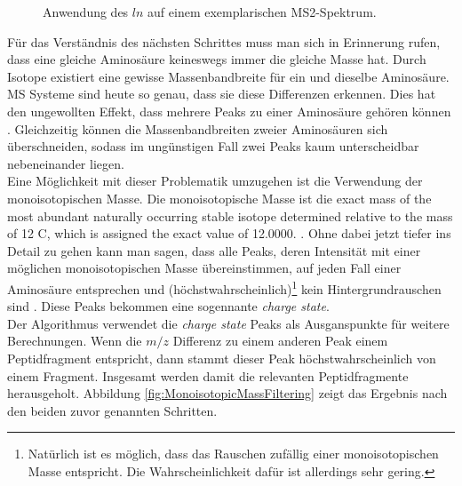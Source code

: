 \documentclass[a4paper, 12pt]{article}
\newcommand{\gerquot}[1]{\glqq#1\grqq}
\newcommand{\tikzScale}{1.0}
\newcommand{\massCharge}{$ m/z $ }
\begin{document}
\begin{figure}[H]
\begin{minipage}[t]{.45\linewidth}
      \end{minipage}
      \caption{Anwendung des $ ln $ auf einem exemplarischen MS2-Spektrum.}
\end{figure}

Für das Verständnis des nächsten Schrittes muss man sich in Erinnerung rufen, dass eine gleiche Aminosäure keineswegs immer die gleiche Masse hat. Durch Isotope existiert eine gewisse \gerquot{Massenbandbreite} für ein und dieselbe Aminosäure. MS Systeme sind heute so genau, dass sie diese Differenzen erkennen. Dies hat den ungewollten Effekt, dass mehrere Peaks zu einer Aminosäure gehören können \cite{IsotopicDistributionMS}. Gleichzeitig können die \gerquot{Massenbandbreiten} zweier Aminosäuren sich überschneiden, sodass im ungünstigen Fall zwei Peaks kaum unterscheidbar nebeneinander liegen.\\

Eine Möglichkeit mit dieser Problematik umzugehen ist die Verwendung der monoisotopischen Masse. Die monoisotopische Masse ist die \gerquot{[...] exact mass of the most abundant naturally occurring stable isotope determined relative to the mass of 12 C, which is assigned the exact value of 12.0000.} \cite{MonoisotopicMass}. Ohne dabei jetzt tiefer ins Detail zu gehen kann man sagen, dass alle Peaks, deren Intensität mit einer möglichen monoisotopischen Masse übereinstimmen, auf jeden Fall einer Aminosäure entsprechen und (höchstwahrscheinlich)\footnote{Natürlich ist es möglich, dass das Rauschen zufällig einer monoisotopischen Masse entspricht. Die Wahrscheinlichkeit dafür ist allerdings sehr gering.} kein Hintergrundrauschen sind \cite{MassDefectMS}. Diese Peaks bekommen eine sogennante \emph{charge state}.\\

Der Algorithmus verwendet die \emph{charge state} Peaks als Ausganspunkte für weitere Berechnungen. Wenn die \massCharge Differenz zu einem anderen Peak einem Peptidfragment entspricht, dann stammt dieser Peak höchstwahrscheinlich von einem Fragment. Insgesamt werden damit die relevanten Peptidfragmente herausgeholt. Abbildung \ref{fig:MonoisotopicMassFiltering} zeigt das Ergebnis nach den beiden zuvor genannten Schritten.
\end{document}
